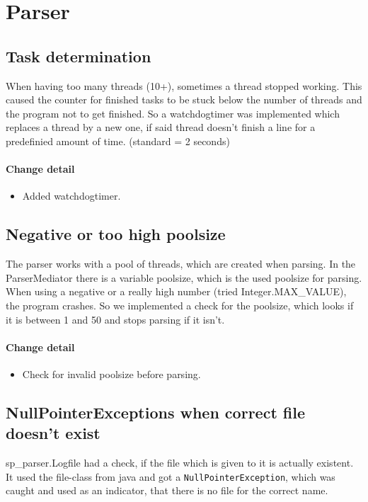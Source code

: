 \section{Parser}

\subsection{Task determination} 
When having too many threads (10+), sometimes a thread stopped working. This caused the counter for finished tasks
to be stuck below the number of threads and the program not to get finished.
So a watchdogtimer was implemented which replaces a thread by a new one, if said thread doesn't finish a line for a 
predefinied amount of time. (standard = 2 seconds)

\paragraph{Change detail}
\begin{itemize}
  \item Added watchdogtimer.
\end{itemize}

\subsection{Negative or too high poolsize}
The parser works with a pool of threads, which are created when parsing. In the ParserMediator there is
a variable poolsize, which is the used poolsize for parsing.
When using a negative or a really high number (tried Integer.MAX\_VALUE), the program crashes. 
So we implemented a check for the poolsize, which looks if it is between 1 and 50 and stops parsing if it isn't.

\paragraph{Change detail}
\begin{itemize}
  \item Check for invalid poolsize before parsing.
\end{itemize}

\subsection{NullPointerExceptions when correct file doesn't exist}
sp\_parser.Logfile had a check, if the file which is given to it is actually existent. It used the file-class from java
and got a \texttt{NullPointerException}, which was caught and used as an indicator, that there is no file for the correct name.

